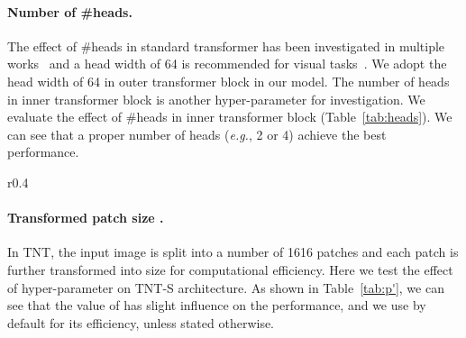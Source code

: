 \documentclass{article}
\begin{document}
\paragraph{Number of \#heads.} The effect of \#heads in standard transformer has been investigated in multiple works~\cite{sixteen-head,Att} and a head width of 64 is recommended for visual tasks~\cite{vit,deit}. We adopt the head width of 64 in outer transformer block in our model. The number of heads in inner transformer block is another hyper-parameter for investigation. We evaluate the effect of \#heads in inner transformer block (Table~\ref{tab:heads}). We can see that a proper number of heads (\emph{e.g.}, 2 or 4) achieve the best performance.

\begin{table}[htp]
	\vspace{-0em}
	\small 
	\centering
	\caption{Effect of \#heads in inner transformer block in TNT-S.}\label{tab:heads}
	\renewcommand{\arraystretch}{1.0}
	\vspace{-1.0em}
\end{table}

\begin{wraptable}{r}{0.4\textwidth}
	\vspace{-2em}
	\small 
	\centering
	\caption{Effect of .}\label{tab:p'}
	\renewcommand{\arraystretch}{1.0}
	\vspace{-1.0em}
\end{wraptable}
\paragraph{Transformed patch size .}
In TNT, the input image is split into a number of 1616 patches and each patch is further transformed into size  for computational efficiency. Here we test the effect of hyper-parameter  on TNT-S architecture. As shown in Table~\ref{tab:p'}, we can see that the value of  has slight influence on the performance, and we use  by default for its efficiency, unless stated otherwise.
\end{document}
